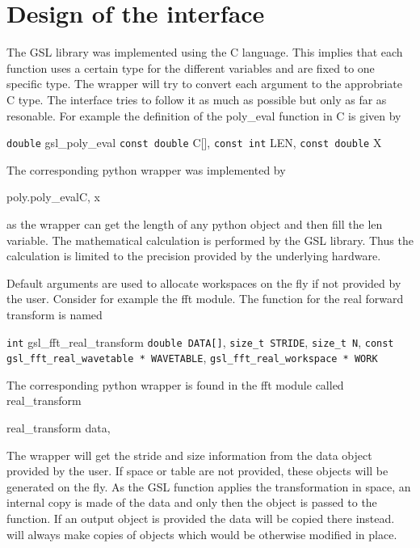 \chapter{Design of the \pygsl{} interface}

The GSL library was implemented using the C language. This implies that 
each function uses a certain type for the different variables and are fixed
 to one specific type. The wrapper will try to convert each argument to the approbriate
C type. 
The \pygsl{} interface
tries to follow it as much as possible but only as far as resonable. 
For example the definition of the poly_eval function in C is given by
\begin{funcdesc}{\texttt{double} gsl_poly_eval}
                {\texttt{const double} C[], \texttt{const int} LEN, \texttt{const double} X}
\end{funcdesc}

The corresponding python wrapper was implemented by
\begin{funcdesc}{poly.poly_eval}{C, x}
\end{funcdesc}
as the wrapper can get the length of any python object and then fill the len variable. 
The mathematical calculation is performed by the GSL library. Thus the calculation is limited 
to the precision provided by the underlying hardware.

Default arguments are used to allocate workspaces on the fly if not provided by the user. 
Consider for example the fft module. The function for the real forward transform is
named 

\begin{funcdesc}{\texttt{int} gsl_fft_real_transform}
{\texttt{double DATA[]}, 
 \texttt{size_t STRIDE},
 \texttt{size_t N}, 
 \texttt{const gsl_fft_real_wavetable * WAVETABLE},
 \texttt{gsl_fft_real_workspace * WORK}
}
\end{funcdesc}

The corresponding python wrapper is found in the fft module called
real_transform
\begin{funcdesc}{real_transform}
{data, }
\end{funcdesc}
The wrapper will get the stride and size information from the data object provided
by the user. If space or table are not provided, these objects will be generated on 
the fly. As the GSL function applies the transformation in space, an internal copy is 
made of the data and only then the object is passed to the \gsl{} function. If an output
object is provided the data will be copied there instead. \pygsl{} will always make copies
of objects which would be otherwise modified in place.

